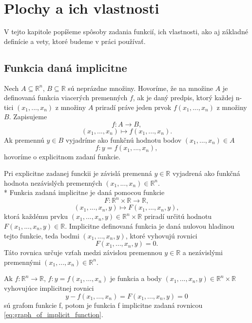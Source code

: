 \chapter{Plochy a ich vlastnosti}

\label{kap:plochy} %

V tejto kapitole popíšeme spôsoby zadania funkcií, ich vlastnosti, 
ako aj základné definície a vety, ktoré budeme v práci používať.

\section{Funkcia daná implicitne}

\begin{definition}
    Nech $A \subseteq \mathbb{R}^n$, $B \subseteq \mathbb{R}$ sú neprázdne množiny. 
Hovoríme, že na množine $A$ je definovaná funkcia viacerých premenných
$f$, ak je daný predpis, ktorý každej n-tici $(x_1, . . . , x_n)$
z množiny $A$ priradí práve jeden prvok $f(x_1, . . . , x_n)$ z množiny $B$.
Zapisujeme 
$$f : A \to B,$$
$$(x_1, . . . , x_n) \mapsto f(x_1, . . . , x_n).$$
Ak premennú $y \in B$ vyjadríme ako funkčnú hodnotu bodov $(x_1, . . . , x_n) \in A$
$$f : y = f(x_1, . . . , x_n),$$
hovoríme o explicitnom zadaní funkcie.
\end{definition}


Pri explicitne zadanej funckii je závislá premenná $y \in \mathbb{R}$ vyjadrená ako funkčná hodnota nezávislých
premenných $(x_1, . . . , x_n)\in\mathbb{R}^n$.
\\*
Funkcia zadaná implicitne je daná pomocou funkcie $$F : \mathbb{R}^n \times \mathbb{R} \to \mathbb{R},$$
$$(x_1, . . . ,x_n, y) \mapsto F(x_1, . . . , x_n, y),$$ ktorá každému prvku $(x_1, . . . ,x_n, y) \in \mathbb{R}^{n} \times \mathbb{R}$ 
priradí určitú hodnotu \mbox{$F(x_1, . . . , x_n, y) \in \mathbb{R}$.}
Implicitne definovaná funkcia je daná nulovou hladinou tejto funkcie, teda bodmi $(x_1, . . . , x_n, y)$, 
ktoré vyhovujú rovnici $$F(x_1, . . . , x_n, y) = 0.$$  
Táto rovnica určuje vzťah medzi závislou premennou $y \in \mathbb{R}$
a nezávislými premennými $(x_1, . . . , x_n) \in \mathbb{R}^n$. 

\begin{note}
    Ak $f : \mathbb{R}^n \to \mathbb{R}$, $f: y = f(x_1, . . . , x_n)$ je funkcia a body
    $(x_1, . . . , x_n, y) \in \mathbb{R}^n \times \mathbb{R}$ vyhovujúce implicitnej rovnici
        \begin{equation}
        \label{eq:graph_of_implicit_function}
        y - f(x_1, ..., x_n) = F(x_1, . . . , x_n, y) = 0
        \end{equation}
    sú grafom funkcie f,
    potom je funkcia f implicitne zadaná rovnicou \ref{eq:graph_of_implicit_function}.
\end{note}

